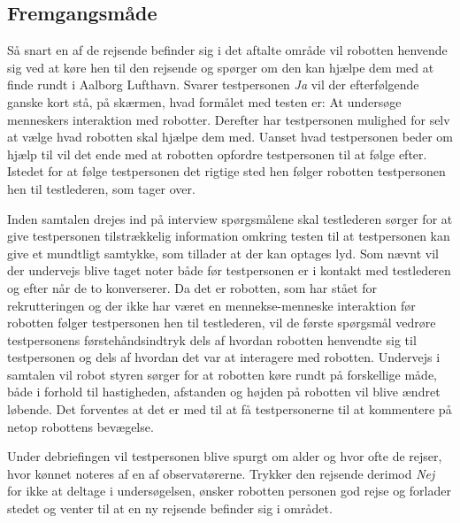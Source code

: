 \subsection*{Fremgangsmåde}
\label{Fremgangsmaade}
%
Så snart en af de rejsende befinder sig i det aftalte område vil robotten henvende sig ved at køre hen til den rejsende og spørger om den kan hjælpe dem med at finde rundt i Aalborg Lufthavn. Svarer testpersonen \textit{Ja} vil der efterfølgende ganske kort stå, på skærmen, hvad formålet med testen er: At undersøge menneskers interaktion med robotter. Derefter har testpersonen mulighed for selv at vælge hvad robotten skal hjælpe dem med. Uanset hvad testpersonen beder om hjælp til vil det ende med at robotten opfordre testpersonen til at følge efter. Istedet for at følge testpersonen det rigtige sted hen følger robotten testpersonen hen til testlederen, som tager over. 

Inden samtalen drejes ind på interview spørgsmålene skal testlederen sørger for at give testpersonen tilstrækkelig information omkring testen til at testpersonen kan give et mundtligt samtykke, som tillader at der kan optages lyd. Som nævnt vil der undervejs blive taget noter både før testpersonen er i kontakt med testlederen og efter når de to konverserer. \blankline
%
Da det er robotten, som har stået for rekrutteringen og der ikke har været en mennekse-menneske interaktion før robotten følger testpersonen hen til testlederen, vil de første spørgsmål vedrøre testpersonens førstehåndsindtryk dels af hvordan robotten henvendte sig til testpersonen og dels af hvordan det var at interagere med robotten. Undervejs i samtalen vil robot styren sørger for at robotten køre rundt på forskellige måde, både i forhold til hastigheden, afstanden og højden på robotten vil blive ændret løbende. Det forventes at det er med til at få testpersonerne til at kommentere på netop robottens bevægelse. 

Under debriefingen vil testpersonen blive spurgt om alder og hvor ofte de rejser, hvor kønnet noteres af en af observatørerne.\blankline      
%
Trykker den rejsende derimod \textit{Nej} for ikke at deltage i undersøgelsen, ønsker robotten personen god rejse og forlader stedet og venter til at en ny rejsende befinder sig i området.



     
